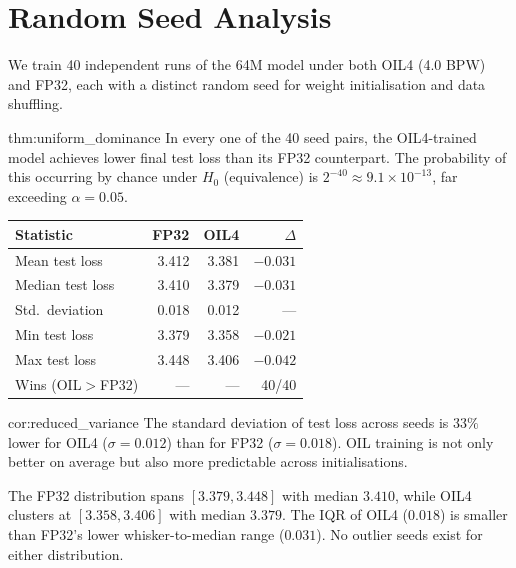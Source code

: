\section{Random Seed Analysis}
\label{sec:seed_analysis}
We train 40 independent runs of the 64M model under both OIL4 (4.0 BPW) and FP32, each
with a distinct random seed for weight initialisation and data shuffling.
\begin{mythm}{thm:uniform_dominance}
In every one of the 40 seed pairs, the OIL4-trained model achieves lower final test loss
than its FP32 counterpart. The probability of this occurring by chance under $H_0$
(equivalence) is $2^{-40} \approx 9.1 \times 10^{-13}$, far exceeding $\alpha = 0.05$.
\end{mythm}
\begin{center}
\begin{tabular}{lrrr}
\toprule
\textbf{Statistic} & \textbf{FP32} & \textbf{OIL4} & \textbf{$\Delta$} \\
\midrule
Mean test loss     & 3.412 & 3.381 & $-0.031$ \\
Median test loss   & 3.410 & 3.379 & $-0.031$ \\
Std.\ deviation    & 0.018 & 0.012 & --- \\
Min test loss      & 3.379 & 3.358 & $-0.021$ \\
Max test loss      & 3.448 & 3.406 & $-0.042$ \\
Wins (OIL$>$FP32) & ---   & ---   & 40/40 \\
\bottomrule
\end{tabular}
\end{center}
\begin{table}[h]
\centering
\caption{Summary statistics over 40 random seeds for the 64M model.}
\label{tab:seed_stats}
\end{table}
\begin{mycor}{cor:reduced_variance}
The standard deviation of test loss across seeds is $33\%$ lower for OIL4 ($\sigma{=}0.012$)
than for FP32 ($\sigma{=}0.018$). OIL training is not only better on average but also more
predictable across initialisations.
\end{mycor}
The FP32 distribution spans $[3.379, 3.448]$ with median $3.410$, while OIL4 clusters at
$[3.358, 3.406]$ with median $3.379$. The IQR of OIL4 ($0.018$) is smaller than FP32's
lower whisker-to-median range ($0.031$). No outlier seeds exist for either distribution.
